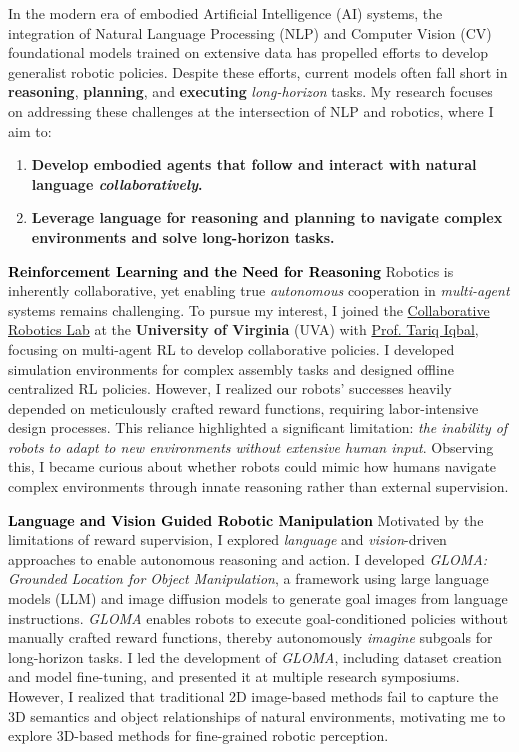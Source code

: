\documentclass[12pt]{article}
\newcommand{\statement}[1]{\medskip\noindent
  \textcolor{black}{\textbf{#1}}\space
}
\begin{document}
\noindent In the modern era of embodied Artificial Intelligence (AI) systems, the integration of Natural Language Processing (NLP) and Computer Vision (CV) foundational models trained on extensive data has propelled efforts to develop generalist robotic policies. Despite these efforts, current models often fall short in \textbf{reasoning}, \textbf{planning}, and \textbf{executing} \textit{long-horizon} tasks. My research focuses on addressing these challenges at the intersection of NLP and robotics, where I aim to:
\begin{enumerate}[label=(\arabic*), itemindent=0pt, itemsep=0pt, parsep=0pt, nosep]
  \item \textbf{Develop embodied agents that follow and interact with natural language \textit{collaboratively}.}
  \item \textbf{Leverage language for reasoning and planning to navigate complex environments and solve long-horizon tasks.}
\end{enumerate}

\statement{Reinforcement Learning and the Need for Reasoning} Robotics is inherently collaborative, yet enabling true \textit{autonomous} cooperation in \textit{multi-agent} systems remains challenging. To pursue my interest, I joined the \href{https://www.collabrobotics.com/}{Collaborative Robotics Lab} at the \textbf{University of Virginia} (UVA) with \href{https://www.tiqbal.com/}{Prof. Tariq Iqbal}, focusing on multi-agent RL to develop collaborative policies. I developed simulation environments for complex assembly tasks and designed offline centralized RL policies. However, I realized our robots' successes heavily depended on meticulously crafted reward functions, requiring labor-intensive design processes. This reliance highlighted a significant limitation: \textit{the inability of robots to adapt to new environments without extensive human input}. Observing this, I became curious about whether robots could mimic how humans navigate complex environments through innate reasoning rather than external supervision.

\statement{Language and Vision Guided Robotic Manipulation} Motivated by the limitations of reward supervision, I explored \textit{language} and \textit{vision}-driven approaches to enable autonomous reasoning and action. I developed \textit{GLOMA: Grounded Location for Object Manipulation}, a framework using large language models (LLM) and image diffusion models to generate goal images from language instructions. \textit{GLOMA} enables robots to execute goal-conditioned policies without manually crafted reward functions, thereby autonomously \textit{imagine} subgoals for long-horizon tasks. I led the development of \textit{GLOMA}, including dataset creation and model fine-tuning, and presented it at multiple research symposiums. However, I realized that traditional 2D image-based methods fail to capture the 3D semantics and object relationships of natural environments, motivating me to explore 3D-based methods for fine-grained robotic perception.
\end{document}
